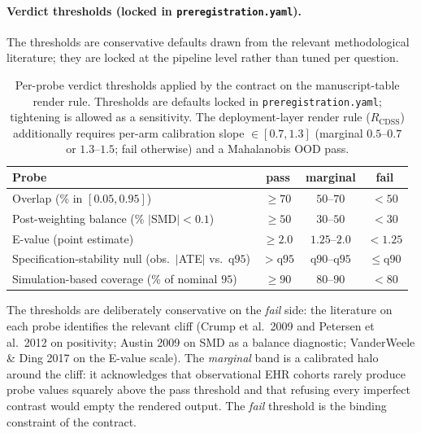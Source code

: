 \documentclass[11pt,a4paper]{article}
\begin{document}
\paragraph{Verdict thresholds (locked in \texttt{preregistration.yaml}).} The thresholds are conservative defaults drawn from the relevant methodological literature; they are locked at the pipeline level rather than tuned per question.

\begin{table}[H]
\centering\small
\caption{Per-probe verdict thresholds applied by the contract on the manuscript-table render rule. Thresholds are defaults locked in \texttt{preregistration.yaml}; tightening is allowed as a sensitivity. The deployment-layer render rule ($R_{\text{CDSS}}$) additionally requires per-arm calibration slope $\in [0.7, 1.3]$ (marginal $0.5$--$0.7$ or $1.3$--$1.5$; fail otherwise) and a Mahalanobis OOD pass.}
\label{tab:verdict_thresholds}
\begin{tabular}{lccc}
\toprule
Probe & pass & marginal & fail \\
\midrule
Overlap (\% in $[0.05,0.95]$) \cite{crump2009dealing,petersen2012positivity} & $\geq 70$ & $50$--$70$ & $<50$ \\
Post-weighting balance (\% $|$SMD$|<0.1$) \cite{austin2009smd} & $\geq 50$ & $30$--$50$ & $<30$ \\
E-value (point estimate) \cite{vanderweele2017evalue} & $\geq 2.0$ & $1.25$--$2.0$ & $<1.25$ \\
Specification-stability null (obs.\ $|$ATE$|$ vs.\ q$95$) & $>$q$95$ & q$90$--q$95$ & $\leq$q$90$ \\
Simulation-based coverage (\% of nominal $95$) & $\geq 90$ & $80$--$90$ & $<80$ \\
\bottomrule
\end{tabular}
\end{table}

The thresholds are deliberately conservative on the \emph{fail} side: the literature on each probe identifies the relevant cliff (Crump et al.\ 2009 \cite{crump2009dealing} and Petersen et al.\ 2012 \cite{petersen2012positivity} on positivity; Austin 2009 \cite{austin2009smd} on SMD as a balance diagnostic; VanderWeele \& Ding 2017 \cite{vanderweele2017evalue} on the E-value scale). The \emph{marginal} band is a calibrated halo around the cliff: it acknowledges that observational EHR cohorts rarely produce probe values squarely above the pass threshold and that refusing every imperfect contrast would empty the rendered output. The \emph{fail} threshold is the binding constraint of the contract.
\end{document}
